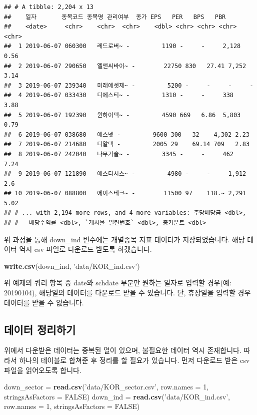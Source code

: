 \documentclass[]{book}
\newenvironment{Shaded}{\begin{snugshade}}{\end{snugshade}}
\newcommand{\DataTypeTok}[1]{\textcolor[rgb]{0.13,0.29,0.53}{#1}}
\newcommand{\DecValTok}[1]{\textcolor[rgb]{0.00,0.00,0.81}{#1}}
\newcommand{\KeywordTok}[1]{\textcolor[rgb]{0.13,0.29,0.53}{\textbf{#1}}}
\newcommand{\NormalTok}[1]{#1}
\newcommand{\OtherTok}[1]{\textcolor[rgb]{0.56,0.35,0.01}{#1}}
\newcommand{\StringTok}[1]{\textcolor[rgb]{0.31,0.60,0.02}{#1}}
\begin{document}
\begin{verbatim}
## # A tibble: 2,204 x 13
##    일자       종목코드 종목명 관리여부  종가 EPS   PER   BPS   PBR  
##    <date>     <chr>    <chr>  <chr>    <dbl> <chr> <chr> <chr> <chr>
##  1 2019-06-07 060300   레드로버~ -         1190 -     -     2,128 0.56 
##  2 2019-06-07 290650   엘앤씨바이~ -        22750 830   27.41 7,252 3.14 
##  3 2019-06-07 239340   미래에셋제~ -         5200 -     -     -     -    
##  4 2019-06-07 033430   디에스티~ -         1310 -     -     338   3.88 
##  5 2019-06-07 192390   윈하이텍~ -         4590 669   6.86  5,803 0.79 
##  6 2019-06-07 038680   에스넷 -         9600 300   32    4,302 2.23 
##  7 2019-06-07 214680   디알텍 -         2005 29    69.14 709   2.83 
##  8 2019-06-07 242040   나무기술~ -         3345 -     -     462   7.24 
##  9 2019-06-07 121890   에스디시스~ -         4980 -     -     1,912 2.6  
## 10 2019-06-07 088800   에이스테크~ -        11500 97    118.~ 2,291 5.02 
## # ... with 2,194 more rows, and 4 more variables: 주당배당금 <dbl>,
## #   배당수익률 <dbl>, `게시물 일련번호` <dbl>, 총카운트 <dbl>
\end{verbatim}

위 과정을 통해 down\_ind 변수에는 개별종목 지표 데이터가 저장되었습니다. 해당 데이터 역시 csv 파일로 다운로드 받도록 하겠습니다.

\begin{Shaded}
\begin{Highlighting}[]
\KeywordTok{write.csv}\NormalTok{(down_ind, }\StringTok{'data/KOR_ind.csv'}\NormalTok{)}
\end{Highlighting}
\end{Shaded}

위 예제의 쿼리 항목 중 date와 schdate 부분만 원하는 일자로 입력할 경우(예: 20190104), 해당일의 데이터를 다운로드 받을 수 있습니다. 단, 휴장일을 입력할 경우 데이터를 받을 수 없습니다.

\hypertarget{section-21}{%
\subsection{데이터 정리하기}\label{section-21}}

위에서 다운받은 데이터는 중복된 열이 있으며, 불필요한 데이터 역시 존재합니다. 따라서 하나의 테이블로 합쳐준 후 정리를 할 필요가 있습니다. 먼저 다운로드 받은 csv 파일을 읽어오도록 합니다.

\begin{Shaded}
\begin{Highlighting}[]
\NormalTok{down_sector =}\StringTok{ }\KeywordTok{read.csv}\NormalTok{(}\StringTok{'data/KOR_sector.csv'}\NormalTok{, }\DataTypeTok{row.names =} \DecValTok{1}\NormalTok{, }\DataTypeTok{stringsAsFactors =} \OtherTok{FALSE}\NormalTok{)}
\NormalTok{down_ind =}\StringTok{ }\KeywordTok{read.csv}\NormalTok{(}\StringTok{'data/KOR_ind.csv'}\NormalTok{,  }\DataTypeTok{row.names =} \DecValTok{1}\NormalTok{, }\DataTypeTok{stringsAsFactors =} \OtherTok{FALSE}\NormalTok{)}
\end{Highlighting}
\end{Shaded}
\end{document}
